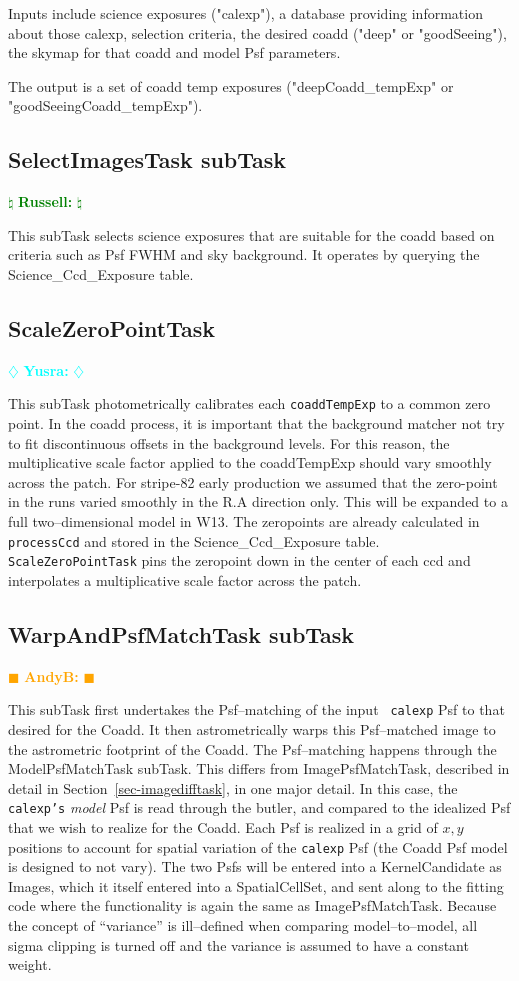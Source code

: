 \documentclass[prd, nofootinbib, floatfix, 11pt,tightenlines,times]{article}
\newcommand{\becker} { \textcolor{orange} {
\ensuremath{\blacksquare} {\bf AndyB:}  
\ensuremath{\blacksquare} } }
\newcommand{\yusra} { \textcolor{cyan} {
\ensuremath{\diamondsuit} {\bf Yusra:}  
\ensuremath{\diamondsuit} } }
\newcommand{\russ} { \textcolor{green} {
\ensuremath{\natural} {\bf Russell:}  
\ensuremath{\natural} } }
\begin{document}
Inputs include science exposures ("calexp"), a database providing information about
those calexp, selection criteria, the desired coadd ("deep" or "goodSeeing"),
the skymap for that coadd and model Psf parameters.

The output is a set of coadd temp exposures ("deepCoadd\_tempExp" or "goodSeeingCoadd\_tempExp").

\subsection{SelectImagesTask subTask} \russ

This subTask selects science exposures that are suitable for the coadd
based on criteria such as Psf FWHM and sky background. It operates by
querying the Science\_Ccd\_Exposure table.

\subsection{ScaleZeroPointTask} \yusra

This subTask  photometrically calibrates each {\tt coaddTempExp} to a common zero point. 
%
In the coadd process, it is important that the background matcher not try to fit discontinuous offsets in the background levels. For this reason, the multiplicative scale factor applied to the coaddTempExp should vary smoothly across the patch. For stripe-82 early production we assumed that the zero-point in the runs varied smoothly in the R.A direction only.  This will be expanded to a full two--dimensional model in W13.  The zeropoints are already calculated in {\tt processCcd} and stored in the Science\_Ccd\_Exposure table. {\tt ScaleZeroPointTask} pins the zeropoint down in the center of each ccd and interpolates a multiplicative scale factor across the patch. 

\subsection{WarpAndPsfMatchTask subTask} \becker

This subTask first undertakes the Psf--matching of the input {\tt
  calexp} Psf to that desired for the Coadd.  It then astrometrically
warps this Psf--matched image to the astrometric footprint of the
Coadd.  The Psf--matching happens through the ModelPsfMatchTask
subTask.  This differs from ImagePsfMatchTask, described in detail in
Section~\ref{sec-imagedifftask}, in one major detail.  In this case,
the {\tt calexp's} {\it model} Psf is read through the butler, and
compared to the idealized Psf that we wish to realize for the Coadd.
Each Psf is realized in a grid of $x,y$ positions to account for
spatial variation of the {\tt calexp} Psf (the Coadd Psf model is
designed to not vary).  The two Psfs will be entered into a
KernelCandidate as Images, which it itself entered into a
SpatialCellSet, and sent along to the fitting code where the
functionality is again the same as ImagePsfMatchTask.  Because the
concept of ``variance'' is ill--defined when comparing
model--to--model, all sigma clipping is turned off and the variance is
assumed to have a constant weight.
\end{document}

